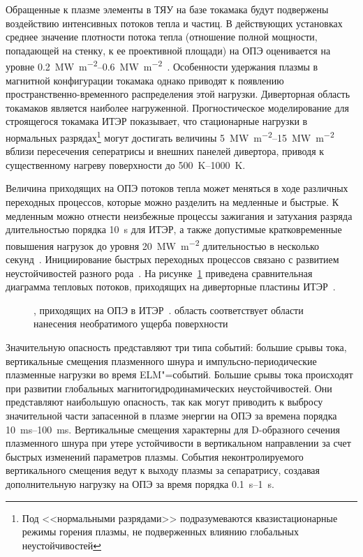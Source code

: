 Обращенные к плазме элементы в ТЯУ на базе токамака будут подвержены воздействию интенсивных потоков тепла и частиц. В действующих установках среднее значение плотности потока тепла (отношение полной мощности, попадающей на стенку, к ее проективной площади) на ОПЭ оценивается на уровне \SIrange{0.2}{0.6}{\mega\watt\per\metre\squared}~\cite{Mazul2021}. Особенности удержания плазмы в магнитной конфигурации токамака однако приводят к появлению пространственно-временного распределения этой нагрузки. Диверторная область токамаков является наиболее нагруженной. Прогностическое моделирование для строящегося токамака ИТЭР показывает, что стационарные нагрузки в нормальных разрядах\footnote{Под <<нормальными разрядами>> подразумеваются квазистационарные режимы горения плазмы, не подверженных влиянию глобальных неустойчивостей} могут достигать величины \SIrange{5}{15}{\mega\watt\per\meter\squared}~\cite{Pitts2019,Orrico2023} вблизи пересечения сеператрисы и внешних панелей дивертора, приводя к существенному нагреву поверхности до \SIrange{500}{1000}{\kelvin}.

Величина приходящих на ОПЭ потоков тепла может меняться в ходе различных переходных процессов, которые можно разделить на медленные и быстрые. К медленным можно отнести неизбежные процессы зажигания и затухания разряда длительностью порядка \SI{10}{\second} для ИТЭР, а также допустимые кратковременные повышения нагрузок до уровня \SI{20}{\mega\watt\per\meter\squared} длительностью в несколько секунд~\cite{Pitts2017}. Инициирование быстрых переходных процессов связано с развитием неустойчивостей разного рода~\cite{hender2007mhd}. На рисунке~\cref{fig:ch1/Heat_loads_diagram} приведена сравнительная диаграмма тепловых потоков, приходящих на диверторные пластины ИТЭР~\cite{Linke2019}.

\begin{figure}[ht]
    \caption{, приходящих на ОПЭ в ИТЭР~\cite{Linke2019}.  область соответствует области нанесения необратимого ущерба поверхности}\label{fig:ch1/Heat_loads_diagram}
\end{figure}

Значительную опасность представляют три типа событий: большие срывы тока, вертикальные смещения плазменного шнура и импульсно-периодические плазменные нагрузки во время ELM"=событий. Большие срывы тока происходят при развитии глобальных магнитогидродинамических неустойчивостей. Они представляют наибольшую опасность, так как могут приводить к выбросу значительной части запасенной в плазме энергии на ОПЭ за времена порядка \SIrange{10}{100}{\milli\second}. Вертикальные смещения характерны для D-образного сечения плазменного шнура при утере устойчивости в вертикальном направлении за счет быстрых изменений параметров плазмы. События неконтролируемого вертикального смещения ведут к выходу плазмы за сепаратрису, создавая дополнительную нагрузку на ОПЭ за время порядка \SIrange{0.1}{1}{\second}. 

